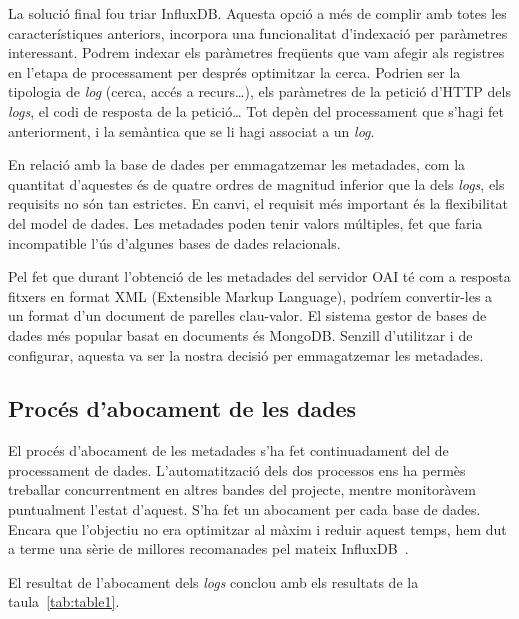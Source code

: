 \documentclass[lettersize,journal]{IEEEtran}
\begin{document}
La solució final fou triar InfluxDB.
Aquesta opció a més de complir amb totes les característiques anteriors, incorpora una funcionalitat d'indexació per paràmetres interessant.
Podrem indexar els paràmetres freqüents que vam afegir als registres en l'etapa de processament per després optimitzar la cerca.
Podrien ser la tipologia de \textit{log} (cerca, accés a recurs\dots), els paràmetres de la petició d'HTTP dels \textit{logs}, el codi de resposta de la petició\dots
Tot depèn del processament que s'hagi fet anteriorment, i la semàntica que se li hagi associat a un \textit{log}.

En relació amb la base de dades per emmagatzemar les metadades, com la quantitat d'aquestes és de quatre ordres de magnitud inferior que la dels \textit{logs}, els requisits no són tan estrictes.
En canvi, el requisit més important és la flexibilitat del model de dades.
Les metadades poden tenir valors múltiples, fet que faria incompatible l'ús d'algunes bases de dades relacionals.

Pel fet que durant l'obtenció de les metadades del servidor OAI té com a resposta fitxers en format XML (Extensible Markup Language), podríem convertir-les a un format d'un document de parelles clau-valor.
El sistema gestor de bases de dades més popular basat en documents és MongoDB.
Senzill d'utilitzar i de configurar, aquesta va ser la nostra decisió per emmagatzemar les metadades.

\subsection{Procés d'abocament de les dades}\label{subsec:data-storing-process}

El procés d'abocament de les metadades s'ha fet continuadament del de processament de dades.
L'automatització dels dos processos ens ha permès treballar concurrentment en altres bandes del projecte, mentre monitoràvem puntualment l'estat d'aquest.
S'ha fet un abocament per cada base de dades.
Encara que l'objectiu no era optimitzar al màxim i reduir aquest temps, hem dut a terme una sèrie de millores recomanades pel mateix InfluxDB~\cite{influxdb:optimizations}.

El resultat de l'abocament dels \textit{logs} conclou amb els resultats de la taula~\ref{tab:table1}.
\end{document}
